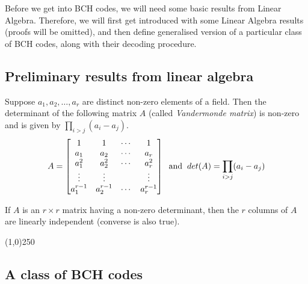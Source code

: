 \documentclass[../main.tex]{subfiles}
\begin{document}
	
Before we get into BCH codes, we will need some basic results from Linear Algebra. Therefore, we will first get introduced with some Linear Algebra results (proofs will be omitted), and then define generalised version of a particular class of BCH codes, along with their decoding procedure.\\

\subsection{Preliminary results from linear algebra}	

\begin{thm}\label{thm_vander}
	Suppose $a_1, a_2, \ldots, a_r$ are distinct non-zero elements of a field. Then the determinant of the following matrix $A$ (called \emph{Vandermonde matrix}) is non-zero and is given by $\displaystyle \prod_{i>j}(a_i - a_j)$.
	\[
		A = 
		\begin{bmatrix}
			1 & 1 & \cdots & 1 \\
			a_1 & a_2 & \cdots & a_r \\
			a_1^2 & a_2^2 & \cdots & a_r^2 \\
			\vdots & \vdots &  & \vdots \\
			a_1^{r-1} & a_2^{r-1} & \cdots & a_r^{r-1} \\
		\end{bmatrix}
		\hspace{2mm}
		\text{and}
		\hspace{2mm}	
		det(A) = \prod_{i>j}(a_i - a_j)
	\]
	
\end{thm}
	
\begin{thm}\label{thm_nonzero_li}
	If $A$ is an $r\times r$ matrix having a non-zero determinant, then the $r$ columns of $A$ are linearly independent (converse is also true).
\end{thm}	

\begin{center}
\line(1,0){250}
\end{center}

\subsection{A class of BCH codes}
\end{document}
